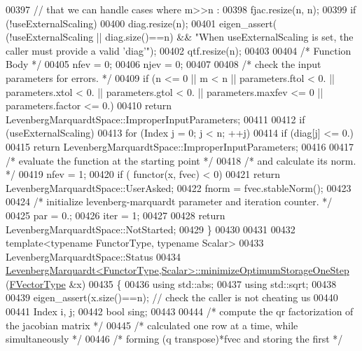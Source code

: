 \begin{DoxyCode}
00397     \textcolor{comment}{// that we can handle cases where m>>n :}
00398     fjac.resize(n, n);
00399     \textcolor{keywordflow}{if} (!useExternalScaling)
00400         diag.resize(n);
00401     eigen\_assert( (!useExternalScaling || diag.size()==n) && \textcolor{stringliteral}{"When useExternalScaling is set, the caller
       must provide a valid 'diag'"});
00402     qtf.resize(n);
00403 
00404     \textcolor{comment}{/* Function Body */}
00405     nfev = 0;
00406     njev = 0;
00407 
00408     \textcolor{comment}{/*     check the input parameters for errors. */}
00409     \textcolor{keywordflow}{if} (n <= 0 || m < n || parameters.ftol < 0. || parameters.xtol < 0. || parameters.gtol < 0. || 
      parameters.maxfev <= 0 || parameters.factor <= 0.)
00410         \textcolor{keywordflow}{return} LevenbergMarquardtSpace::ImproperInputParameters;
00411 
00412     \textcolor{keywordflow}{if} (useExternalScaling)
00413         \textcolor{keywordflow}{for} (Index j = 0; j < n; ++j)
00414             \textcolor{keywordflow}{if} (diag[j] <= 0.)
00415                 \textcolor{keywordflow}{return} LevenbergMarquardtSpace::ImproperInputParameters;
00416 
00417     \textcolor{comment}{/*     evaluate the function at the starting point */}
00418     \textcolor{comment}{/*     and calculate its norm. */}
00419     nfev = 1;
00420     \textcolor{keywordflow}{if} ( functor(x, fvec) < 0)
00421         \textcolor{keywordflow}{return} LevenbergMarquardtSpace::UserAsked;
00422     fnorm = fvec.stableNorm();
00423 
00424     \textcolor{comment}{/*     initialize levenberg-marquardt parameter and iteration counter. */}
00425     par = 0.;
00426     iter = 1;
00427 
00428     \textcolor{keywordflow}{return} LevenbergMarquardtSpace::NotStarted;
00429 \}
00430 
00431 
00432 \textcolor{keyword}{template}<\textcolor{keyword}{typename} FunctorType, \textcolor{keyword}{typename} Scalar>
00433 LevenbergMarquardtSpace::Status
00434 \hyperlink{class_eigen_1_1_levenberg_marquardt}{LevenbergMarquardt<FunctorType,Scalar>::minimizeOptimumStorageOneStep}
      (\hyperlink{group___core___module}{FVectorType}  &x)
00435 \{
00436     \textcolor{keyword}{using} std::abs;
00437     \textcolor{keyword}{using} std::sqrt;
00438     
00439     eigen\_assert(x.size()==n); \textcolor{comment}{// check the caller is not cheating us}
00440 
00441     Index i, j;
00442     \textcolor{keywordtype}{bool} sing;
00443 
00444     \textcolor{comment}{/* compute the qr factorization of the jacobian matrix */}
00445     \textcolor{comment}{/* calculated one row at a time, while simultaneously */}
00446     \textcolor{comment}{/* forming (q transpose)*fvec and storing the first */}

\end{DoxyCode}
